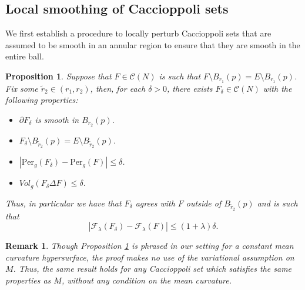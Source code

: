 \documentclass[11pt]{article}
\newtheorem{prop}{Proposition}
\newtheorem{rem}{Remark}
\begin{document}
\subsection{Local smoothing of Caccioppoli sets}\label{subsec: local smoothing of caccioppoli sets}

We first establish a procedure to locally perturb Caccioppoli sets that are assumed to be smooth in an annular region to ensure that they are smooth in the entire ball.

\begin{prop}\label{prop: local smoothing}
Suppose that $F \in \mathcal{C}(N)$ is such that $F \setminus B_{r_1}(p) = E \setminus B_{r_1}(p)$. Fix some $\tilde{r}_2 \in (r_1,r_2)$, then, for each $\delta > 0$, there exists $F_\delta \in \mathcal{C}(N)$ with the following properties:
\begin{itemize}
    \item $\partial F_\delta$ is smooth in $B_{r_2}(p)$.
    
    \item $F_\delta \setminus B_{\tilde{r}_2}(p) = E \setminus B_{\tilde{r}_2}(p)$.
    
    \item $|\mathrm{Per}_g(F_\delta) - \mathrm{Per}_g(F)| \leq \delta$.
    
    \item $Vol_g(F_\delta \Delta F) \leq \delta$.
\end{itemize}   
Thus, in particular we have that $F_\delta$ agrees with $F$ outside of $B_{\tilde{r}_2}(p)$ and is such that 
\begin{equation*}
    |\mathcal{F}_\lambda(F_\delta) - \mathcal{F}_\lambda(F)| 
\leq (1 + \lambda)\delta.
\end{equation*}
\end{prop}

\begin{rem}
Though Proposition \ref{prop: local smoothing} is phrased in our setting for a constant mean curvature hypersurface, the proof makes no use of the variational assumption on $M$. Thus, the same result holds for any Caccioppoli set which satisfies the same properties as $M$, without any condition on the mean curvature.
\end{rem}
\end{document}
